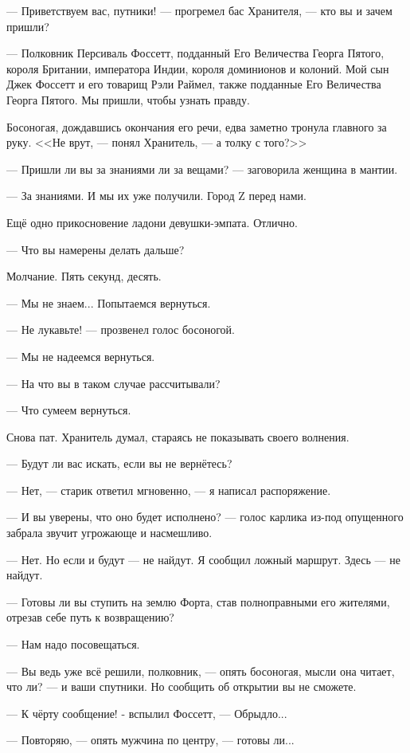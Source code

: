 --- Приветствуем вас, путники! --- прогремел бас Хранителя, --- кто вы и зачем пришли?

--- Полковник Персиваль Фоссетт, подданный Его Величества Георга Пятого, короля Британии, императора Индии,
короля доминионов и колоний. Мой сын Джек Фоссетт и его товарищ Рэли Раймел, также подданные Его Величества Георга Пятого.
Мы пришли, чтобы узнать правду.

Босоногая, дождавшись окончания его речи, едва заметно тронула главного за руку.
<<Не врут, --- понял Хранитель, --- а толку с того?>>

--- Пришли ли вы за знаниями ли за вещами? --- заговорила женщина в мантии.

--- За знаниями. И мы их уже получили. Город Z перед нами.

Ещё одно прикосновение ладони девушки-эмпата. Отлично.

--- Что вы намерены делать дальше?

Молчание. Пять секунд, десять.

--- Мы не знаем... Попытаемся вернуться.

--- Не лукавьте! --- прозвенел голос босоногой.

--- Мы не надеемся вернуться.

--- На что вы в таком случае рассчитывали?

--- Что сумеем вернуться.

Снова пат. Хранитель думал, стараясь не показывать своего волнения.

--- Будут ли вас искать, если вы не вернётесь?

--- Нет, --- старик ответил мгновенно, --- я написал распоряжение.

--- И вы уверены, что оно будет исполнено? --- голос карлика из-под опущенного забрала звучит угрожающе и насмешливо.

--- Нет. Но если и будут --- не найдут. Я сообщил ложный маршрут. Здесь --- не найдут.

--- Готовы ли вы ступить на землю Форта, став полноправными его жителями, отрезав себе путь к возвращению?

--- Нам надо посовещаться.

--- Вы ведь уже всё решили, полковник, --- опять босоногая, мысли она читает, что ли? --- и ваши спутники.
Но сообщить об открытии вы не сможете.

--- К чёрту сообщение! - вспылил Фоссетт, --- Обрыдло...

--- Повторяю, --- опять мужчина по центру, --- готовы ли...


